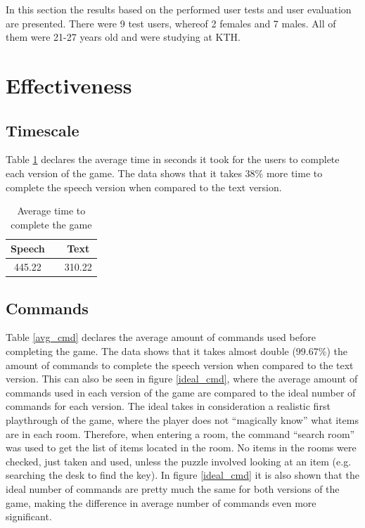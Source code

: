 In this section the results based on the performed user tests and user evaluation are presented. There were 9 test users, whereof 2 females and 7 males. All of them were 21-27 years old and were studying at KTH.

\section{Effectiveness}

\subsection{Timescale} %
Table \ref{avg_time} declares the average time in seconds it took for the users to complete each version of the game. The data shows that it takes 38\% more time to complete the speech version when compared to the text version.

\begin{table}[ht]
  \centering
  \begin{tabular}{ccc}
    \toprule
    Speech &   & Text\\
    \midrule
    445.22 &   & 310.22\\
    \bottomrule
  \end{tabular}
  \caption{Average time to complete the game}\label{avg_time}
\end{table}

\subsection{Commands} %
Table \ref{avg_cmd} declares the average amount of commands used before completing the game. The data shows that it takes almost double (99.67\%) the amount of commands to complete the speech version when compared to the text version. This can also be seen in figure \ref{ideal_cmd}, where the average amount of commands used in each version of the game are compared to the ideal number of commands for each version. The ideal takes in consideration a realistic first playthrough of the game, where the player does not ``magically know'' what items are in each room. Therefore, when entering a room, the command “search room” was used to get the list of items located in the room. No items in the rooms were checked, just taken and used, unless the puzzle involved looking at an item (e.g. searching the desk to find the key). In figure \ref{ideal_cmd} it is also shown that the ideal number of commands are pretty much the same for both versions of the game, making the difference in average number of commands even more significant.

